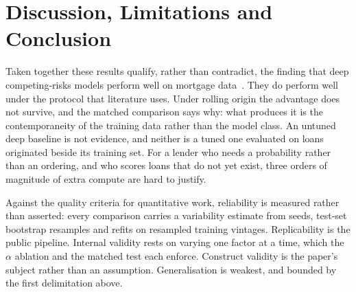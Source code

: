 \documentclass[11pt,journal]{IEEEtran}
\begin{document}
\section{Discussion, Limitations and Conclusion}
Taken together these results qualify, rather than contradict, the finding that
deep competing-risks models perform well on mortgage
data~\cite{DBLP:journals/jors/BlumenstockLS22}. They do perform well under the
protocol that literature uses. Under rolling origin the advantage does not
survive, and the matched comparison says why: what produces it is the
contemporaneity of the training data rather than the model class. An untuned deep
baseline is not evidence, and neither is a tuned one evaluated on loans
originated beside its training set. For a lender who needs a probability rather
than an ordering, and who scores loans that do not yet exist, three orders of
magnitude of extra compute are hard to justify.

Against the quality criteria for quantitative work, reliability is measured
rather than asserted: every comparison carries a variability estimate from
seeds, test-set bootstrap resamples and refits on resampled training vintages.
Replicability is the public pipeline. Internal validity rests on varying one
factor at a time, which the $\alpha$ ablation and the matched test each enforce.
Construct validity is the paper's subject rather than an assumption. Generalisation
is weakest, and bounded by the first delimitation above.
\end{document}

